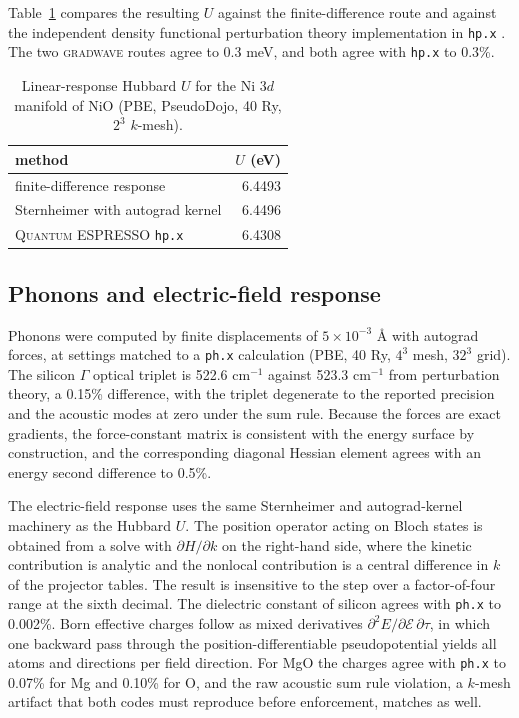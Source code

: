 \documentclass[11pt,twocolumn]{article}
\newcommand{\gw}{\textsc{gradwave}}
\newcommand{\qe}{\textsc{Quantum ESPRESSO}}
\begin{document}
Table~\ref{tab:u} compares the resulting $U$ against the finite-difference
route and against the independent density functional perturbation theory
implementation in \texttt{hp.x} \cite{timrov2018}. The two \gw{} routes
agree to 0.3 meV, and both agree with \texttt{hp.x} to 0.3\%.

\begin{table}[t]\centering
\caption{Linear-response Hubbard $U$ for the Ni $3d$ manifold of NiO
(PBE, PseudoDojo, 40 Ry, $2^3$ $k$-mesh).}
\label{tab:u}
\begin{tabular}{lr}
\toprule
method & $U$ (eV) \\
\midrule
finite-difference response & 6.4493 \\
Sternheimer with autograd kernel & 6.4496 \\
\qe{} \texttt{hp.x} & 6.4308 \\
\bottomrule
\end{tabular}
\end{table}

\subsection{Phonons and electric-field response}
\label{sec:phonons}

Phonons were computed by finite displacements of $5\times10^{-3}$ \AA{}
with autograd forces, at settings matched to a \texttt{ph.x} calculation
(PBE, 40 Ry, $4^3$ mesh, $32^3$ grid). The silicon $\Gamma$ optical triplet is 522.6 cm$^{-1}$ against 523.3 cm$^{-1}$ from
perturbation theory, a 0.15\% difference, with the triplet degenerate to
the reported precision and the acoustic modes at zero under the sum rule.
Because the forces are exact gradients, the force-constant matrix is
consistent with the energy surface by construction, and the corresponding
diagonal Hessian element agrees with an energy second difference to
0.5\%.

The electric-field response uses the same Sternheimer and autograd-kernel
machinery as the Hubbard $U$. The position operator acting on Bloch
states is obtained from a solve with $\partial H/\partial k$ on the
right-hand side, where the kinetic contribution is analytic and the
nonlocal contribution is a central difference in $k$ of the projector
tables. The result is insensitive to the step over a factor-of-four range
at the sixth decimal. The dielectric constant of silicon agrees with
\texttt{ph.x} to 0.002\%. Born effective charges follow as mixed
derivatives $\partial^2 E/\partial \mathcal{E}\,\partial\tau$, in which one
backward pass through the position-differentiable pseudopotential yields
all atoms and directions per field direction. For MgO the charges agree
with \texttt{ph.x} to 0.07\% for Mg and 0.10\% for O, and the raw acoustic
sum rule violation, a $k$-mesh artifact that both codes must reproduce
before enforcement, matches as well.
\end{document}
